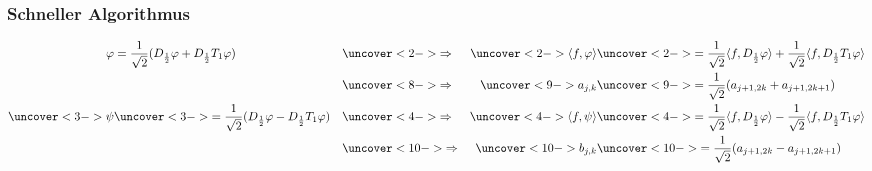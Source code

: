 %
%
%
\begin{frame}
\frametitle{Schneller Algorithmus}
\begin{align*}
\varphi
&=
\frac1{\sqrt{2}}(D_{\frac12}\varphi + D_{\frac12}T_1\varphi)
&&\uncover<2->{\Rightarrow}&
\uncover<2->{\langle f,\varphi\rangle}
&\uncover<2->{=
\frac1{\sqrt{2}} \langle f,D_{\frac12}\varphi\rangle
+
\frac1{\sqrt{2}} \langle f,D_{\frac12}T_1\varphi\rangle}
\\
&&&\uncover<8->{\Rightarrow}&
\uncover<9->{a_{j,k}}&\uncover<9->{=\frac1{\sqrt{2}} (a_{j+1,2k} + a_{j+1,2k+1})}
\\
\uncover<3->{\psi}
&\uncover<3->{=
\frac1{\sqrt{2}}(D_{\frac12}\varphi - D_{\frac12}T_1\varphi)}
&&\uncover<4->{\Rightarrow}&
\uncover<4->{\langle f,\psi\rangle}
&\uncover<4->{=
\frac1{\sqrt{2}} \langle f,D_{\frac12}\varphi\rangle
-
\frac1{\sqrt{2}} \langle f,D_{\frac12}T_1\varphi\rangle}
\\
&&&\uncover<10->{\Rightarrow}&
\uncover<10->{b_{j,k}}&\uncover<10->{=\frac1{\sqrt{2}} (a_{j+1,2k} - a_{j+1,2k+1})}
\end{align*}

\end{frame}


